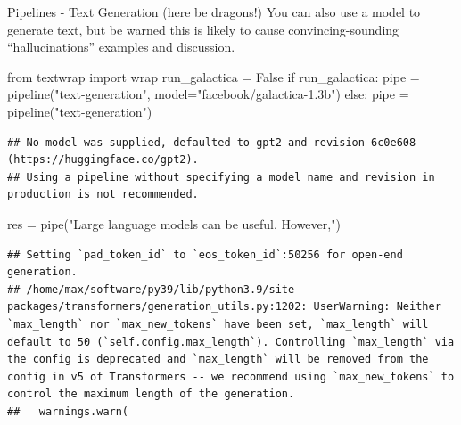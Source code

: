 \documentclass[
  10pt,
  ignorenonframetext,
  aspectratio=169]{beamer}
\newenvironment{Shaded}{\begin{snugshade}}{\end{snugshade}}
\newcommand{\ControlFlowTok}[1]{\textcolor[rgb]{0.94,0.87,0.69}{#1}}
\newcommand{\ImportTok}[1]{\textcolor[rgb]{0.80,0.80,0.80}{#1}}
\newcommand{\NormalTok}[1]{\textcolor[rgb]{0.80,0.80,0.80}{#1}}
\newcommand{\OperatorTok}[1]{\textcolor[rgb]{0.94,0.94,0.82}{#1}}
\newcommand{\StringTok}[1]{\textcolor[rgb]{0.80,0.58,0.58}{#1}}
\newcommand{\VariableTok}[1]{\textcolor[rgb]{0.80,0.80,0.80}{#1}}
\begin{document}
\begin{frame}[fragile]{Pipelines - Text Generation (here be dragons!)}
\protect\hypertarget{pipelines---text-generation-here-be-dragons}{}
You can also use a model to generate text, but be warned this is likely
to cause convincing-sounding ``hallucinations''
\href{https://twitter.com/search?q=galactica\&src=typed_query}{examples
and discussion}.

\medskip
\scriptsize

\begin{Shaded}
\begin{Highlighting}[]
\ImportTok{from}\NormalTok{ textwrap }\ImportTok{import}\NormalTok{ wrap}
\NormalTok{run\_galactica }\OperatorTok{=} \VariableTok{False}
\ControlFlowTok{if}\NormalTok{ run\_galactica:}
\NormalTok{    pipe }\OperatorTok{=}\NormalTok{ pipeline(}\StringTok{"text{-}generation"}\NormalTok{, model}\OperatorTok{=}\StringTok{"facebook/galactica{-}1.3b"}\NormalTok{)}
\ControlFlowTok{else}\NormalTok{:}
\NormalTok{    pipe }\OperatorTok{=}\NormalTok{ pipeline(}\StringTok{"text{-}generation"}\NormalTok{)}
    
\end{Highlighting}
\end{Shaded}

\begin{verbatim}
## No model was supplied, defaulted to gpt2 and revision 6c0e608 (https://huggingface.co/gpt2).
## Using a pipeline without specifying a model name and revision in production is not recommended.
\end{verbatim}

\begin{Shaded}
\begin{Highlighting}[]
\NormalTok{res }\OperatorTok{=}\NormalTok{ pipe(}\StringTok{"Large language models can be useful. However,"}\NormalTok{)}
\end{Highlighting}
\end{Shaded}

\begin{verbatim}
## Setting `pad_token_id` to `eos_token_id`:50256 for open-end generation.
## /home/max/software/py39/lib/python3.9/site-packages/transformers/generation_utils.py:1202: UserWarning: Neither `max_length` nor `max_new_tokens` have been set, `max_length` will default to 50 (`self.config.max_length`). Controlling `max_length` via the config is deprecated and `max_length` will be removed from the config in v5 of Transformers -- we recommend using `max_new_tokens` to control the maximum length of the generation.
##   warnings.warn(
\end{verbatim}


\end{frame}
\end{document}
